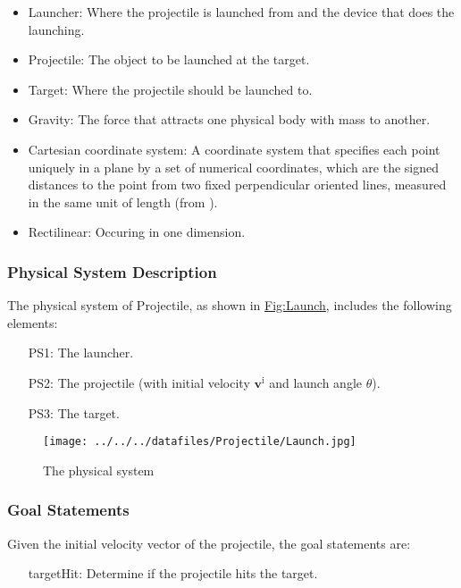 \documentclass[12pt]{article}
\begin{document}
\begin{itemize}
\item{Launcher: Where the projectile is launched from and the device that does the launching.}
\item{Projectile: The object to be launched at the target.}
\item{Target: Where the projectile should be launched to.}
\item{Gravity: The force that attracts one physical body with mass to another.}
\item{Cartesian coordinate system: A coordinate system that specifies each point uniquely in a plane by a set of numerical coordinates, which are the signed distances to the point from two fixed perpendicular oriented lines, measured in the same unit of length (from \cite{cartesianWiki}).}
\item{Rectilinear: Occuring in one dimension.}
\end{itemize}
\subsubsection{Physical System Description}
\label{Sec:PhysSyst}
The physical system of Projectile, as shown in \hyperref[Figure:Launch]{Fig:Launch}, includes the following elements:

\begin{itemize}
\item[PS1:]{The launcher.}
\item[PS2:]{The projectile (with initial velocity ${\mathbf{v}^{\text{i}}}$ and launch angle $θ$).}
\item[PS3:]{The target.}
\end{itemize}
\begin{figure}
\begin{center}
\texttt{[image: ../../../datafiles/Projectile/Launch.jpg]}
\caption{The physical system}
\label{Figure:Launch}
\end{center}
\end{figure}
\subsubsection{Goal Statements}
\label{Sec:GoalStmt}
Given the initial velocity vector of the projectile, the goal statements are:

\begin{itemize}
\item[targetHit:\phantomsection\label{targetHit}]{Determine if the projectile hits the target.}
\end{itemize}
\end{document}
